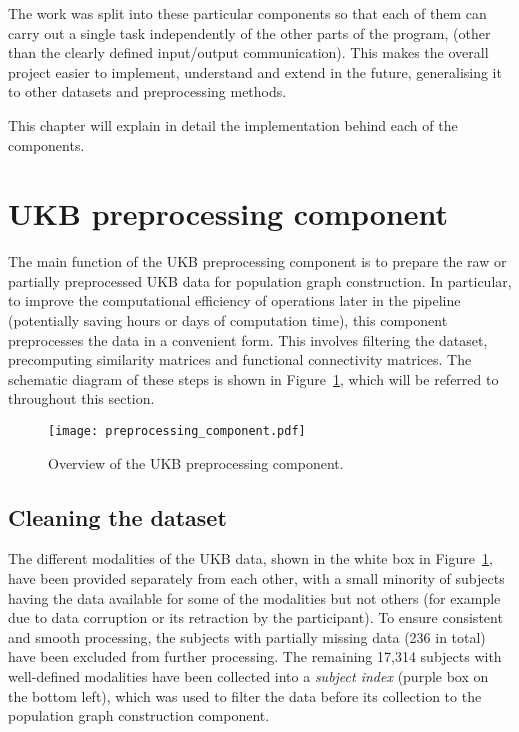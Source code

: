 The work was split into these particular components so that each of them can carry out a single task independently of the other parts of the program, (other than the clearly defined input/output communication). This makes the overall project easier to implement, understand and extend in the future, generalising it to other datasets and preprocessing methods. 

This chapter will explain in detail the implementation behind each of the components.

\section{UKB preprocessing component}

The main function of the UKB preprocessing component is to prepare the raw or partially preprocessed UKB data for population graph construction. In particular, to improve the computational efficiency of operations later in the pipeline (potentially saving hours or days of computation time), this component preprocesses the data in a convenient form. This involves filtering the dataset, precomputing similarity matrices and functional connectivity matrices. The schematic diagram of these steps is shown in Figure~\ref{preprocessing-component}, which will be referred to throughout this section.

\begin{figure}[h]
    \centering
    \texttt{[image: preprocessing\_component.pdf]}
    \caption{Overview of the UKB preprocessing component.}\label{preprocessing-component}
\end{figure}

\subsection{Cleaning the dataset}
The different modalities of the UKB data, shown in the white box in Figure~\ref{preprocessing-component}, have been provided separately from each other, with a small minority of subjects having the data available for some of the modalities but not others (for example due to data corruption or its retraction by the participant). To ensure consistent and smooth processing, the subjects with partially missing data (236 in total) have been excluded from further processing. The remaining 17,314 subjects with well-defined modalities have been collected into a \textit{subject index} (purple box on the bottom left), which was used to filter the data before its collection to the population graph construction component.

